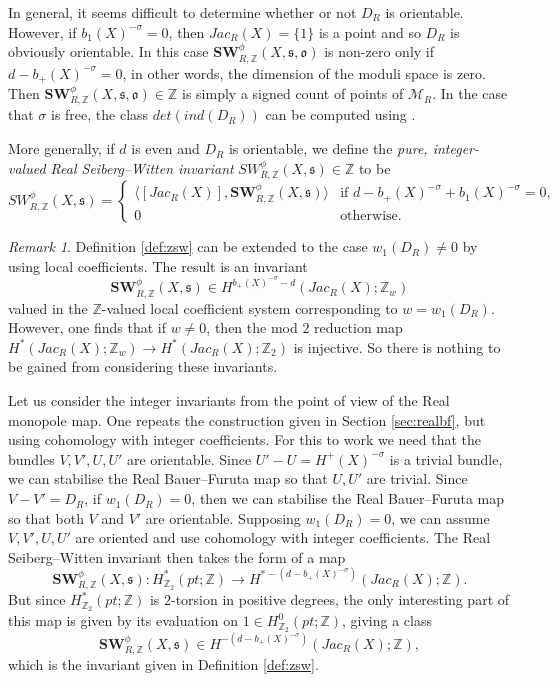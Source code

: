 \documentclass{amsart}
\theoremstyle{definition}
\theoremstyle{remark}
\newtheorem{remark}[theorem]{Remark}
\numberwithin{equation}{section}
\begin{document}
In general, it seems difficult to determine whether or not $D_R$ is orientable. However, if $b_1(X)^{-\sigma} = 0$, then $Jac_R(X) = \{1\}$ is a point and so $D_R$ is obviously orientable. In this case $\mathbf{SW}^\phi_{R,\mathbb{Z}}(X , \mathfrak{s} , \mathfrak{o})$ is non-zero only if $d - b_+(X)^{-\sigma} = 0$, in other words, the dimension of the moduli space is zero. Then $\mathbf{SW}^\phi_{R,\mathbb{Z}}(X , \mathfrak{s} , \mathfrak{o}) \in \mathbb{Z}$ is simply a signed count of points of $\mathcal{M}_R$. In the case that $\sigma$ is free, the class $det(ind(D_R))$ can be computed using \cite[Theorem 5.9]{mi2}.

More generally, if $d$ is even and $D_R$ is orientable, we define the {\em pure, integer-valued Real Seiberg--Witten invariant} $SW^\phi_{R,\mathbb{Z}}(X,\mathfrak{s}) \in \mathbb{Z}$ to be
\[
SW^\phi_{R,\mathbb{Z}}(X,\mathfrak{s}) = \begin{cases} \langle [Jac_R(X)] , \mathbf{SW}^\phi_{R,\mathbb{Z}}(X,\mathfrak{s}) \rangle & \text{if } d - b_+(X)^{-\sigma} + b_1(X)^{-\sigma} = 0, \\ 0 & \text{otherwise}. \end{cases}
\]

\begin{remark}
Definition \ref{def:zsw} can be extended to the case $w_1(D_R) \neq 0$ by using local coefficients. The result is an invariant 
\[
\mathbf{SW}^\phi_{R,\mathbb{Z}}(X,\mathfrak{s}) \in H^{b_+(X)^{-\sigma} - d}(Jac_R(X) ; \mathbb{Z}_w)
\]
valued in the $\mathbb{Z}$-valued local coefficient system corresponding to $w = w_1(D_R)$. However, one finds that if $w \neq 0$, then the mod $2$ reduction map $H^*( Jac_R(X) ; \mathbb{Z}_w) \to H^*(Jac_R(X) ; \mathbb{Z}_2)$ is injective. So there is nothing to be gained from considering these invariants.
\end{remark}

Let us consider the integer invariants from the point of view of the Real monopole map. One repeats the construction given in Section \ref{sec:realbf}, but using cohomology with integer coefficients. For this to work we need that the bundles $V,V',U,U'$ are orientable. Since $U' - U = H^+(X)^{-\sigma}$ is a trivial bundle, we can stabilise the Real Bauer--Furuta map so that $U,U'$ are trivial. Since $V - V' = D_R$, if $w_1(D_R) = 0$, then we can stabilise the Real Bauer--Furuta map so that both $V$ and $V'$ are orientable. Supposing $w_1(D_R) = 0$, we can assume $V,V',U,U'$ are oriented and use cohomology with integer coefficients. The Real Seiberg--Witten invariant then takes the form of a map
\[
\mathbf{SW}^\phi_{R,\mathbb{Z}}(X , \mathfrak{s}) : H^*_{\mathbb{Z}_2}(pt ; \mathbb{Z}) \to H^{* - (d-b_+(X)^{-\sigma})}( Jac_R(X) ; \mathbb{Z}).
\]
But since $H^*_{\mathbb{Z}_2}(pt ; \mathbb{Z})$ is $2$-torsion in positive degrees, the only interesting part of this map is given by its evaluation on $1 \in H^0_{\mathbb{Z}_2}(pt ; \mathbb{Z})$, giving a class
\[
\mathbf{SW}^\phi_{R,\mathbb{Z}}(X,\mathfrak{s}) \in H^{-(d-b_+(X)^{-\sigma})}(Jac_R(X) ; \mathbb{Z}),
\]
which is the invariant given in Definition \ref{def:zsw}.
\end{document}
